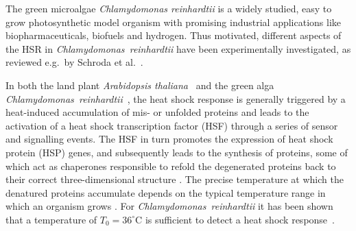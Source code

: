 \documentclass[oneside, 10pt, a4paper, twocolumn]{article}
\begin{document}
The green microalgae \emph{Chlamydomonas reinhardtii} %
is a widely studied, easy to grow photosynthetic model organism with promising  industrial applications like biopharmaceuticals, biofuels and hydrogen. 
Thus motivated, different aspects of the HSR in \emph{Chlamydomonas~reinhardtii} have been experimentally investigated, as reviewed e.g.~by Schroda et al.~\cite{Schroda2015}.


In both the land plant \textit{Arabidopsis thaliana}~\cite{Kurepa2003,Sugio2009} and the green alga \textit{Chlamydomonas~reinhardtii}~\cite{Schmollinger2013},
the heat shock response is generally triggered by a heat-induced accumulation of mis- or unfolded proteins
and leads to the activation
of a heat shock transcription factor (HSF)  through a series of sensor and signalling events. The HSF in turn promotes the expression of 
heat shock protein (HSP) genes, and subsequently leads to the synthesis of proteins, some of which act as chaperones responsible to refold the degenerated proteins back to
their correct three-dimensional structure \cite{Craig1993}. 
The precise temperature at which the denatured proteins accumulate depends on the typical temperature range
in which an organism grows \cite{Lindquist1988}. 
For \textit{Chlamydomonas~reinhardtii}
it has been shown that a temperature of $T_0 = 36^\circ\text{C}$ is sufficient to detect a heat shock response~\cite{Kobayashi2014}.
\end{document}
